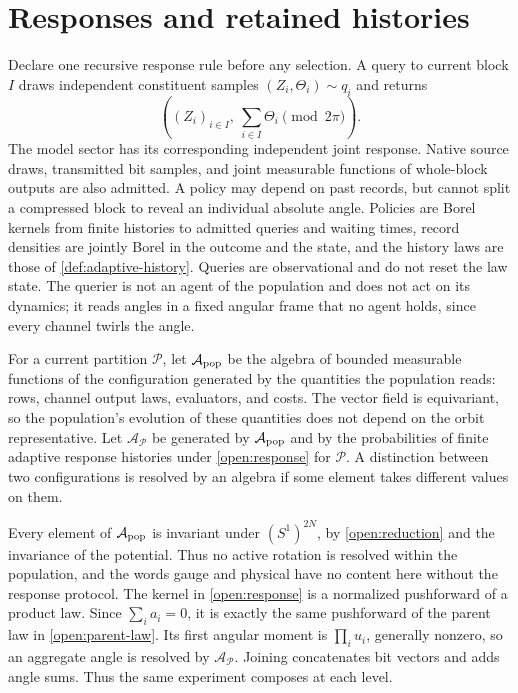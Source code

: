 \section{Responses and retained histories}

Declare one recursive response rule before any selection. A query to current block $I$ draws independent constituent samples $(Z_i,\Theta_i)\sim q_i$ and returns
\begin{equation}
\left((Z_i)_{i\in I},\ \sum_{i\in I}\Theta_i\pmod{2\pi}\right).
\label{open:response}
\end{equation}
The model sector has its corresponding independent joint response. Native source draws, transmitted bit samples, and joint measurable functions of whole-block outputs are also admitted. A policy may depend on past records, but cannot split a compressed block to reveal an individual absolute angle. Policies are Borel kernels from finite histories to admitted queries and waiting times, record densities are jointly Borel in the outcome and the state, and the history laws are those of \cref{def:adaptive-history}. Queries are observational and do not reset the law state. The querier is not an agent of the population and does not act on its dynamics; it reads angles in a fixed angular frame that no agent holds, since every channel twirls the angle.

For a current partition $\mathcal P$, let $\mathcal A_{\rm pop}$ be the algebra of bounded measurable functions of the configuration generated by the quantities the population reads: rows, channel output laws, evaluators, and costs. The vector field is equivariant, so the population's evolution of these quantities does not depend on the orbit representative. Let $\mathcal A_{\mathcal P}$ be generated by $\mathcal A_{\rm pop}$ and by the probabilities of finite adaptive response histories under \cref{open:response} for $\mathcal P$. A distinction between two configurations is resolved by an algebra if some element takes different values on them.

Every element of $\mathcal A_{\rm pop}$ is invariant under $(S^1)^{2N}$, by \cref{open:reduction} and the invariance of the potential. Thus no active rotation is resolved within the population, and the words gauge and physical have no content here without the response protocol. The kernel in \cref{open:response} is a normalized pushforward of a product law. Since $\sum_ia_i=0$, it is exactly the same pushforward of the parent law in \cref{open:parent-law}. Its first angular moment is $\prod_iu_i$, generally nonzero, so an aggregate angle is resolved by $\mathcal A_{\mathcal P}$. Joining concatenates bit vectors and adds angle sums. Thus the same experiment composes at each level.

